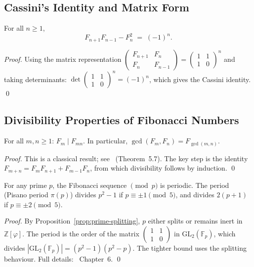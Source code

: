\subsection{Cassini's Identity and Matrix Form}

\begin{theorem}\label{thm:cassini}
  For all $n \geq 1$,
  \[
    F_{n+1}F_{n-1} - F_n^2 \;=\; (-1)^n.
  \]
\end{theorem}

\begin{proof}
  Using the matrix representation
  $\begin{pmatrix} F_{n+1} & F_n \\ F_n & F_{n-1} \end{pmatrix}
  = \begin{pmatrix}1&1\\1&0\end{pmatrix}^n$
  and taking determinants: $\det \begin{pmatrix}1&1\\1&0\end{pmatrix}^n
  = (-1)^n$, which gives the Cassini identity.
  \qed
\end{proof}

\subsection{Divisibility Properties of Fibonacci Numbers}

\begin{lemma}[Divisibility]\label{lem:fib-divisibility}
  For all $m, n \geq 1$: $F_m \mid F_{mn}$.  In particular,
  $\gcd(F_m, F_n) = F_{\gcd(m,n)}$.
\end{lemma}

\begin{proof}
  This is a classical result; see \cite{koshy_fib_lucas}~(Theorem~5.7).
  The key step is the identity
  $F_{m+n} = F_m F_{n+1} + F_{m-1} F_n$, from which divisibility
  follows by induction.  \qed
\end{proof}

\begin{proposition}\label{prop:fib-mod-p}
  For any prime $p$, the Fibonacci sequence $\pmod{p}$ is periodic.
  The period (Pisano period $\pi(p)$) divides $p^2 - 1$ if $p \equiv \pm 1 \pmod{5}$,
  and divides $2(p+1)$ if $p \equiv \pm 2 \pmod{5}$.
\end{proposition}

\begin{proof}
  By Proposition~\ref{prop:prime-splitting}, $p$ either splits or remains
  inert in $\mathbb{Z}[\varphi]$.  The period is the order of the
  matrix $\begin{pmatrix}1&1\\1&0\end{pmatrix}$ in $\mathrm{GL}_2(\mathbb{F}_p)$,
  which divides $|\mathrm{GL}_2(\mathbb{F}_p)| = (p^2-1)(p^2-p)$.
  The tighter bound uses the splitting behaviour.
  Full details: \cite{koshy_fib_lucas}~Chapter~6.  \qed
\end{proof}

